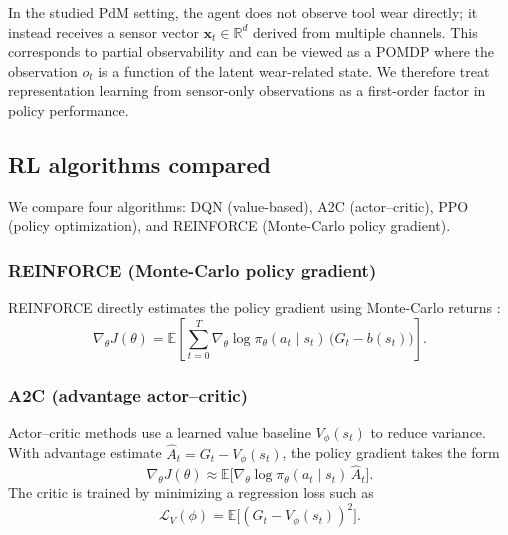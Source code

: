 \documentclass[sn-basic]{sn-jnl} %
\begin{document}
In the studied PdM setting, the agent does not observe tool wear directly; it instead receives a sensor vector $\mathbf{x}_t\in\mathbb{R}^d$ derived from multiple channels. This corresponds to partial observability and can be viewed as a POMDP where the observation $o_t$ is a function of the latent wear-related state. We therefore treat representation learning from sensor-only observations as a first-order factor in policy performance.
\label{sec:pomdp}
\subsection{RL algorithms compared}
\label{sec:algos}
We compare four algorithms: DQN (value-based), A2C (actor--critic), PPO (policy optimization), and REINFORCE (Monte-Carlo policy gradient).

\subsubsection{REINFORCE (Monte-Carlo policy gradient)}
REINFORCE directly estimates the policy gradient using Monte-Carlo returns \cite{Williams1992}:
\begin{equation}
\nabla_\theta J(\theta) = \mathbb{E}\left[\sum_{t=0}^{T} \nabla_\theta \log \pi_\theta(a_t\mid s_t)\,\big(G_t-b(s_t)\big)\right].
\end{equation}

\subsubsection{A2C (advantage actor--critic)}
Actor--critic methods use a learned value baseline $V_\phi(s_t)$ to reduce variance. With advantage estimate $\hat{A}_t=G_t-V_\phi(s_t)$, the policy gradient takes the form
\begin{equation}
\nabla_\theta J(\theta) \approx \mathbb{E}\big[\nabla_\theta\log\pi_\theta(a_t\mid s_t)\,\hat{A}_t\big].
\end{equation}
The critic is trained by minimizing a regression loss such as
\begin{equation}
\mathcal{L}_V(\phi)=\mathbb{E}\big[(G_t - V_\phi(s_t))^2\big].
\end{equation}
\end{document}
